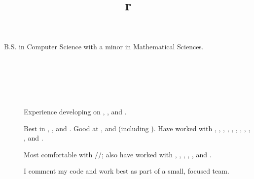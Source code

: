\begin{resume}


\section{}

B.S. in Computer Science with a minor in Mathematical Sciences.


\begin{formatb}
  \title{r}\\
  \\
  \body\\
\end{formatb}


\section{}
\begin{description}
\item[]
Experience developing on , ,  and .
\item[]
Best in , ,  and \kw{\Cplusplus}.
Good at ,  and  (including
).
Have worked with \kw{\LaTeX}, , ,
\kw{\CSharp}, , , , , ,
,  and .

\item[]
Most comfortable with //;
also have worked with , , ,
, ,  and .

\item[]
I comment my code and work best as part of a small, focused team.

\end{description}

\section{}


\end{resume}
